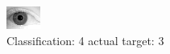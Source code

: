 \begin{figure}[h!]
\begin{center}
\includegraphics[width=0.60\columnwidth]{figures/ID2185_class_4_target_3.png}
\end{center}
\caption{ Classification: 4 actual target: 3}
\label{fig:ID2185_class_4_target_3}
\end{figure}

